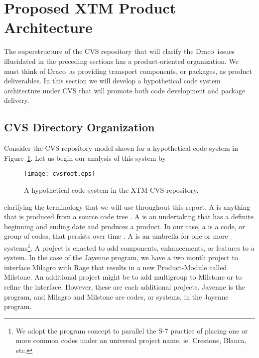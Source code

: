 \documentclass[11pt]{rnote}
\newcommand{\draco}{\textsf{Draco}}
\newcommand{\pkg}[1]{\textsf{#1}}
\begin{document}

\section{Proposed XTM Product Architecture}
\label{sec:architecture}

The superstructure of the CVS repository that will clarify the \draco\ 
issues illucidated in the preceding sections has a product-oriented
organization.  We must think of \draco\ as providing transport
components, or packages, as product deliverables.  In this section we
will develop a hypothetical code system architecture under CVS that will
promote both code development and package delivery.  

\subsection{CVS Directory Organization}

Consider the CVS repository model shown for a hypothetical code system
in Figure~\ref{fig:cvsroot}.  Let us begin our analysis of this system
by
\begin{figure}
  \centerline{\texttt{[image: cvsroot.eps]}}
  \caption{A hypothetical code system in the XTM CVS repository.}
  \label{fig:cvsroot}
\end{figure}
clarifying the terminology that we will use throughout this report. A
\latin{product} is anything that is produced from a source code tree
\cite{ja94}.  A \latin{project} is an undertaking that has a definite
beginning and ending date and produces a product.  In our case, a
\latin{system} is a code, or group of codes, that persists over time
\cite{tn98}.  A \latin{program} is an umbrella for one or more
systems\footnote{We adopt the program concept to parallel the S-7
  practice of placing one or more common codes under an universal
  project name, ie.  Crestone, Blanca, etc.}.  A project is enacted to
add components, enhancements, or features to a system.  In the case of
the \pkg{Jayenne} program, we have a two month project to interface
\pkg{Milagro} with \pkg{Rage} that results in a new
\pkg{Product-Module} called \pkg{Milstone}.  An additional project
might be to add multigroup to \pkg{Milstone} or to refine the
interface.  However, these are each additional projects.
\pkg{Jayenne} is the program, and \pkg{Milagro} and \pkg{Milstone} are
codes, or systems, in the \pkg{Jayenne} program.
\end{document}
